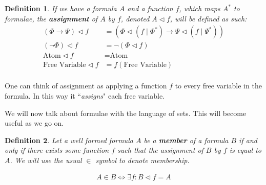 \documentclass{article}
\newtheorem{defin}{Definition}
\begin{document}
\begin{defin}
If we have a formula $A$ and a function $f$, which maps $A^\ast$ to formulae,
the \textbf{assignment} of $A$ by $f$, denoted $A \lhd f$, will be defined as such:
\begin{align*}
(\Phi \rightarrow \Psi) \lhd f &= (\Phi \lhd (f \mid \Phi^\ast) \rightarrow \Psi \lhd (f \mid \Psi^\ast)) \\
(\neg \Phi) \lhd f &= \neg (\Phi \lhd f) \\
\text{Atom} \lhd f &= \text{Atom} \\
\text{Free Variable} \lhd f &= f(\text{Free Variable}) \\
\end{align*}
\end{defin}

One can think of assignment as applying a function $f$ to every free variable in the formula.
In this way it ``\textit{assigns}" each free variable.

We will now talk about formulae with the language of sets.
This will become useful as we go on.

\begin{defin}
Let a well formed formula $A$ be a \textbf{member} of a formula $B$
if and only if there exists some function $f$ such that the assignment of $B$ by $f$ is equal to $A$.
We will use the usual $\in$ symbol to denote membership.

\begin{align*}
A \in B \iff \exists f: B \lhd f = A
\end{align*}
\end{defin}
\end{document}
